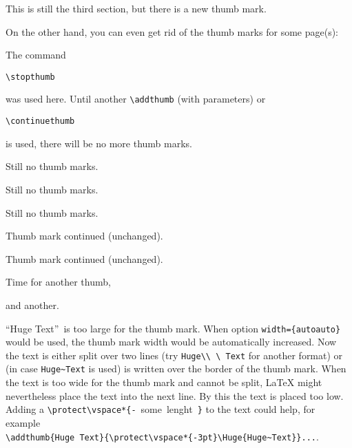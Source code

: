 \documentclass[twoside,british]{article}[2007/10/19]%
\begin{document}
\newpage


This is still the third section, but there is a new thumb mark.

On the other hand, you can even get rid of the thumb marks
for some page(s):

\newpage

\stopthumb

The command
\begin{verbatim}
\stopthumb
\end{verbatim}
was used here. Until another \verb|\addthumb| (with parameters) or
\begin{verbatim}
\continuethumb
\end{verbatim}
is used, there will be no more thumb marks.

\newpage

Still no thumb marks.

\newpage

Still no thumb marks.

\newpage

Still no thumb marks.

\newpage

\continuethumb

Thumb mark continued (unchanged).

\newpage

Thumb mark continued (unchanged).

\newpage

Time for another thumb,


and another.


\bigskip

\textquotedblleft {\Huge{Huge Text}}\textquotedblright\ is too large for
the thumb mark. When option \texttt{width=\{autoauto\}} would be used,
the thumb mark width would be automatically increased. Now the text is
either split over two lines (try \verb|Huge\\ \ Text| for another format)
or (in case \verb|Huge~Text| is used) is written over the border of the
thumb mark. When the text is too wide for the thumb mark and cannot
be split, \LaTeX{} might nevertheless place the text into the next line.
By this the text is placed too low. Adding a
\hbox{\verb|\protect\vspace*{-| some lenght \verb|}|} to the text could help,
for example\\
\verb|\addthumb{Huge Text}{\protect\vspace*{-3pt}\Huge{Huge~Text}}...|.
\label{HugeText}
\end{document}
